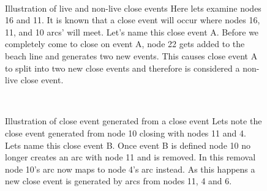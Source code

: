 \documentclass{egpubl}
\begin{document}
\begin{figure}
	\centering
	 \\
	\caption{Illustration of live and non-live close events 
		\protect{} Here lets examine nodes 16 and 11. It is known that a close event will occur where nodes 16, 11, and 10 arcs' will meet. Let's name this close event A.
		\protect{} Before we completely come to close on event A, node 22 gets added to the beach line and generates two new events. This causes  close event A to split into two new close events and therefore is considered a non-live close event. 
	}
	\label{fig:live_events}
\end{figure}

\begin{figure}
	\centering
	 \\
	\caption{Illustration of close event generated from a close event
		\protect{} Lets note the close event generated from node 10 closing with nodes 11 and 4. Lets name this close event B.
		\protect{} Once event B is defined node 10 no longer creates an arc with node 11 and is removed. In this removal node 10's arc now maps to node 4's arc instead. As this happens a new close event is generated by arcs from nodes 11, 4 and 6.
	}
	\label{fig:close_events}
\end{figure}





\end{document}
